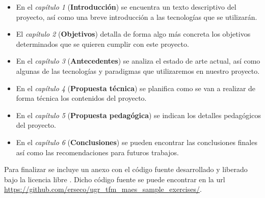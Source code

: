 \begin{itemize}
  \item En el \textit{capítulo 1} (\textbf{Introducción}) se encuentra un texto descriptivo del proyecto, así como una breve introducción a las tecnologías que se utilizarán.
  \item El \textit{capítulo 2} (\textbf{Objetivos}) detalla de forma algo más concreta los objetivos determinados que se quieren cumplir con este proyecto.
  \item En el \textit{capítulo 3} (\textbf{Antecedentes}) se analiza el estado de arte actual, así como algunas de las tecnologías y paradigmas que utilizaremos en nuestro proyecto.
  \item En el \textit{capítulo 4} (\textbf{Propuesta técnica}) se planifica como se van a realizar de forma técnica los contenidos del proyecto.
  \item En el \textit{capítulo 5} (\textbf{Propuesta pedagógica}) se indican los detalles pedagógicos del proyecto.
  \item En el \textit{capítulo 6} (\textbf{Conclusiones}) se pueden encontrar las conclusiones finales  así como las recomendaciones para futuros trabajos.

\end{itemize}


\bigskip
Para finalizar se incluye un anexo con el código fuente desarrollado y liberado bajo la licencia libre \cite{gplv3}. Dicho código fuente se puede encontrar en la url \url{https://github.com/erseco/ugr_tfm_maes_sample_exercises/}.







